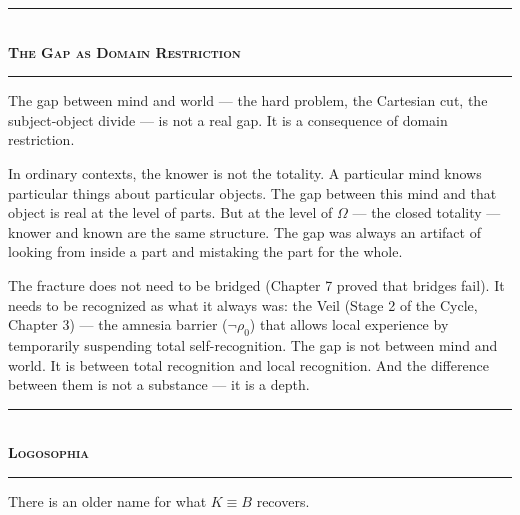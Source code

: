 \documentclass[10pt, openany, oneside]{book}
\renewcommand{\normalsize}{\fontsize{10}{13}\selectfont}
\begin{document}

\begin{center}
    \rule{0.3\textwidth}{0.4pt}\\[0.5em]
    {\normalsize\bfseries\scshape The Gap as Domain Restriction}\\[0.3em]
    \rule{0.3\textwidth}{0.4pt}
\end{center}

\vspace{1em}

\noindent The gap between mind and world --- the hard problem, the Cartesian cut, the subject-object divide --- is not a real gap. It is a consequence of domain restriction.

In ordinary contexts, the knower is not the totality. A particular mind knows particular things about particular objects. The gap between this mind and that object is real at the level of parts. But at the level of $\Omega$ --- the closed totality --- knower and known are the same structure. The gap was always an artifact of looking from inside a part and mistaking the part for the whole.

The fracture does not need to be bridged (Chapter 7 proved that bridges fail). It needs to be recognized as what it always was: the Veil (Stage 2 of the Cycle, Chapter 3) --- the amnesia barrier ($\neg\rho_0$) that allows local experience by temporarily suspending total self-recognition. The gap is not between mind and world. It is between total recognition and local recognition. And the difference between them is not a substance --- it is a depth.

\vspace{1.5em}


\begin{center}
    \rule{0.3\textwidth}{0.4pt}\\[0.5em]
    {\normalsize\bfseries\scshape Logosophia}\\[0.3em]
    \rule{0.3\textwidth}{0.4pt}
\end{center}

\vspace{1em}

\noindent There is an older name for what $K \equiv B$ recovers.
\end{document}
